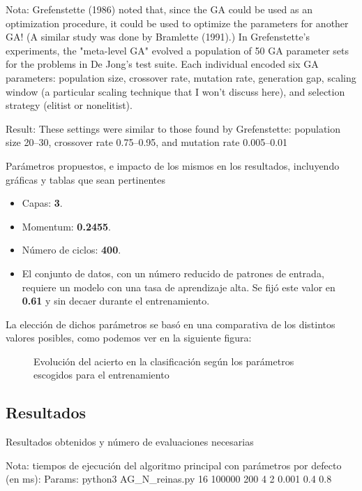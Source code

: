 \documentclass[12pt]{article}
\begin{document}
Nota:  Grefenstette (1986) noted that, since the GA could be used as an optimization procedure, it could be used to optimize the parameters for another GA! (A similar study was done by Bramlette (1991).) In Grefenstette's experiments, the "meta-level GA" evolved a population of 50 GA parameter sets for the problems in De Jong's test suite. Each individual encoded six GA parameters: population size, crossover rate, mutation rate, generation gap, scaling window (a particular scaling technique that I won't discuss here), and selection strategy (elitist or nonelitist).

Result: These settings were similar to those found by Grefenstette: population size 20–30, crossover rate 0.75–0.95, and mutation rate 0.005–0.01

Parámetros propuestos, e impacto de los mismos en los 
resultados, incluyendo 
gráficas y 
tablas que sean pertinentes

\begin{itemize}
    \setlength\itemsep{0em}
    \item Capas: \textbf{3}.
    \item Momentum: \textbf{0.2455}.
    \item Número de ciclos: \textbf{400}.
    \item El conjunto de datos, con un número reducido de patrones de
    entrada, requiere un modelo con una tasa de aprendizaje alta. Se fijó este
    valor en \textbf{0.61} y sin decaer durante el entrenamiento.
\end{itemize}

La elección de dichos parámetros se basó en una comparativa de los distintos
valores posibles, como podemos ver en la siguiente figura:

\begin{figure}[h]
    \center
    \caption{Evolución del acierto en la clasificación según los parámetros escogidos para el entrenamiento}
    \label{}
\end{figure}

\subsection{Resultados}

Resultados obtenidos y 
número de evaluaciones
necesarias

Nota: tiempos de ejecución del algoritmo principal con parámetros por defecto (en ms):
Params: python3 AG\_N\_reinas.py 16 100000 200 4 2 0.001 0.4 0.8
\end{document}
